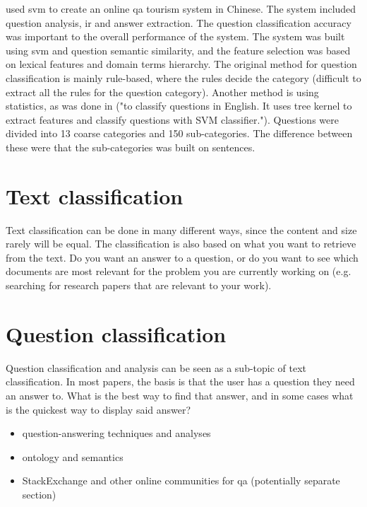 \cite{XuZhouWang2012} used \gls{svm} to create an online \gls{qa} tourism system in Chinese. The 
system included question analysis, \gls{ir} and answer extraction. The question classification 
accuracy was important to the overall performance of the system. The system was built using 
\gls{svm} and question semantic similarity, and the feature selection was based on lexical features 
and domain terms hierarchy. The original method for question classification is mainly rule-based, 
where the rules decide the category (difficult to extract all the rules for the question category). 
Another method is using statistics, as was done in \cite{ZhangLee2003} ("to classify questions in English. It uses tree kernel to extract features and classify questions with SVM classifier."). 
Questions were divided into 13 coarse categories and 150 sub-categories. The difference between 
these were that the sub-categories was built on sentences.



\section{Text classification}
\label{sec:text_classification}
Text classification can be done in many different ways, since the content and size rarely will be 
equal. The classification is also based on what you want to retrieve from the text. Do you want 
an answer to a question, or do you want to see which documents are most relevant for the problem 
you are currently working on (e.g. searching for research papers that are relevant to your work).

\section{Question classification}
\label{sec:question_answering}
Question classification and analysis can be seen as a sub-topic of text classification. In most 
papers, the basis is that the user has a question they need an answer to. What is the best way 
to find that answer, and in some cases what is the quickest way to display said answer?
 
\begin{itemize}
	\item question-answering techniques and analyses
	\item ontology and semantics
	\item StackExchange and other online communities for qa (potentially separate section)
\end{itemize}

